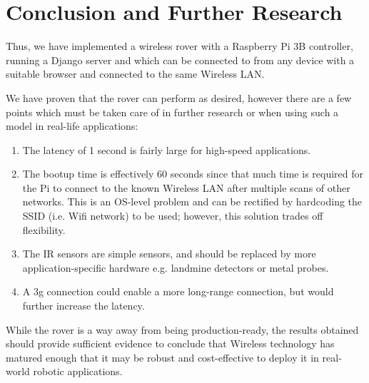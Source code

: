 \section{Conclusion and Further Research}

Thus, we have implemented a wireless rover with a Raspberry Pi 3B controller, running a Django server and which can be connected to from any device with a suitable browser and connected to the same Wireless LAN. 

We have proven that the rover can perform as desired, however there are a few points which must be taken care of in further research or when using such a model in real-life applications:

\begin{enumerate}
	\item The latency of 1 second is fairly large for high-speed applications. 
	
	\item The bootup time is effectively 60 seconds since that much time is required for the Pi to connect to the known Wireless LAN after multiple scans of other networks. This is an OS-level problem and can be rectified by hardcoding the SSID (i.e. Wifi network) to be used; however, this solution trades off flexibility. 
	
	\item The IR sensors are simple sensors, and should be replaced by more application-specific hardware e.g. landmine detectors or metal probes.
	
	\item A 3g connection could enable a more long-range connection, but would further increase the latency.
	
	
\end{enumerate}

While the rover is a way away from being production-ready, the results obtained should provide sufficient evidence to conclude that Wireless technology has matured enough that it may be robust and cost-effective to deploy it in real-world robotic applications. 